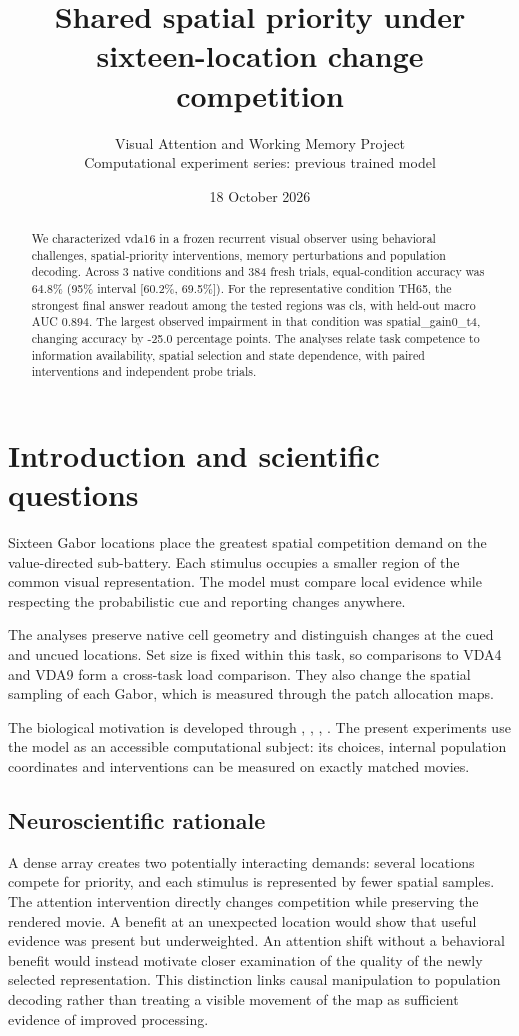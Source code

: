 \documentclass[11pt]{article}
\begin{document}
\title{\color{ink}Shared spatial priority under sixteen-location change competition}
\author{Visual Attention and Working Memory Project\\Computational experiment series: previous trained model}\date{18 October 2026}\maketitle
\begin{abstract}
We characterized vda16 in a frozen recurrent visual observer using behavioral challenges, spatial-priority interventions, memory perturbations and population decoding. Across 3 native conditions and 384 fresh trials, equal-condition accuracy was 64.8\% (95\% interval [60.2\%, 69.5\%]). For the representative condition TH65, the strongest final answer readout among the tested regions was cls, with held-out macro AUC 0.894. The largest observed impairment in that condition was spatial\_\allowbreak{}gain0\_\allowbreak{}t4, changing accuracy by -25.0 percentage points. The analyses relate task competence to information availability, spatial selection and state dependence, with paired interventions and independent probe trials.
\end{abstract}
\section{Introduction and scientific questions}
Sixteen Gabor locations place the greatest spatial competition demand on the value-directed sub-battery. Each stimulus occupies a smaller region of the common visual representation. The model must compare local evidence while respecting the probabilistic cue and reporting changes anywhere.

The analyses preserve native cell geometry and distinguish changes at the cued and uncued locations. Set size is fixed within this task, so comparisons to VDA4 and VDA9 form a cross-task load comparison. They also change the spatial sampling of each Gabor, which is measured through the patch allocation maps.

The biological motivation is developed through \cite{rvit}, \cite{sc}, \cite{normalization}, \cite{wolfe}. The present experiments use the model as an accessible computational subject: its choices, internal population coordinates and interventions can be measured on exactly matched movies.

\subsection{Neuroscientific rationale}
A dense array creates two potentially interacting demands: several locations compete for priority, and each stimulus is represented by fewer spatial samples. The attention intervention directly changes competition while preserving the rendered movie. A benefit at an unexpected location would show that useful evidence was present but underweighted. An attention shift without a behavioral benefit would instead motivate closer examination of the quality of the newly selected representation. This distinction links causal manipulation to population decoding rather than treating a visible movement of the map as sufficient evidence of improved processing.
\end{document}

